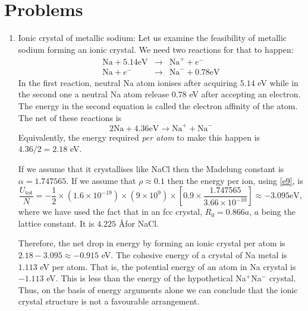 \documentclass{article}
\begin{document}
\section{Problems}
\begin{enumerate}
\item Ionic crystal of metallic sodium: Let us examine the feasibility of 
metallic sodium forming an ionic crystal. We need two reactions for that to
happen:
\begin{eqnarray*}
\text{Na} + 5.14 \text{eV} &\rightarrow& \text{Na}^+ + e^- \\
\text{Na} + e^- &\rightarrow& \text{Na}^- + 0.78 \text{eV}
\end{eqnarray*}
In the first reaction, neutral Na atom ionises after acquiring $5.14$ eV while
in the second one a neutral Na atom release $0.78$ eV after accepting an 
electron. The energy in the second equation is called the electron affinity of
the atom. The net of these reactions is
\[
2\text{Na} + 4.36 \text{eV} \rightarrow \text{Na}^+ + \text{Na}^- 
\]
Equivalently, the energy required \emph{per atom} to make this happen is $4.36
/2 = 2.18$ eV.

If we assume that it crystallises like NaCl then the Madelung constant is
$\alpha = 1.747565$. If we assume that $\rho \approx 0.1$ then the energy per
ion, using \eqref{e9}, is
\[
\frac{U_\text{tot}}{N} = -\frac{1}{2} \times (1.6 \times 10^{-19}) \times 
(9 \times 10^9) \times \left[0.9 \times \frac{1.747565}{3.66 \times 10^{-10}}
\right] \approx -3.095 \text{eV},
\]
where we have used the fact that in an fcc crystal, $R_0 = 0.866 a$, $a$ being
the lattice constant. It is $4.225$ \AA for NaCl.

Therefore, the net drop in energy by forming an ionic crystal per atom is
$2.18 - 3.095 \approx -0.915$ eV. The cohesive energy of a crystal of Na metal
is $1.113$ eV per atom. That is, the potential energy of an atom in Na crystal
is $-1.113$ eV. This is less than the energy of the hypothetical Na$^+$Na$^-$
crystal. Thus, on the basis of energy arguments alone we can conclude that the
ionic crystal structure is not a favourable arrangement.


\end{enumerate}
\end{document}
